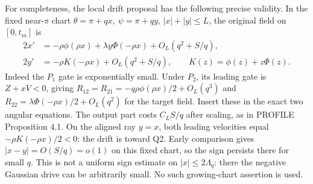 \documentclass[11pt]{article}
\numberwithin{equation}{section}
\theoremstyle{remark}\newtheorem{remark}[proposition]{Remark}
\begin{document}
For completeness, the local drift proposal has the following precise
validity. In the fixed near-$\pi$ chart
$\theta=\pi+qx,\ \psi=\pi+qy$, $|x|+|y|\le L$, the original field on
$[0,t_m]$ is
\begin{equation}
 \begin{split}
 2x'&=-\rho\phi(\rho x)+\lambda y\Phi(-\rho x)
                      +O_L(q^2+S/q),\\
 2y'&=-\rho K(-\rho x)+O_L(q^2+S/q),\qquad
 K(z)=\phi(z)+z\Phi(z).
 \end{split}                                      \label{an03q3sbv1:pifield}
\end{equation}
Indeed the $P_1$ gate is exponentially small. Under $P_2$, its leading
gate is $Z+xV<0$, giving
$R_{12}=R_{21}=-q\rho\phi(\rho x)/2+O_L(q^3)$ and
$R_{22}=\lambda\Phi(-\rho x)/2+O_L(q^2)$ for the target field.
Insert these in the exact two angular equations. The output part
costs $C_LS/q$ after scaling, as in PROFILE Proposition 4.1.
On the aligned ray $y=x$, both leading velocities equal
$-\rho K(-\rho x)/2<0$: the drift is toward Q2.
Early comparison gives $|x-y|=O(S/q)=o(1)$ on this fixed chart, so
the sign persists there for small $q$. This is not a uniform sign
estimate on $|x|\le2\Lambda_q$: there the negative Gaussian drive
can be arbitrarily small. No such growing-chart assertion is used.
\end{document}
